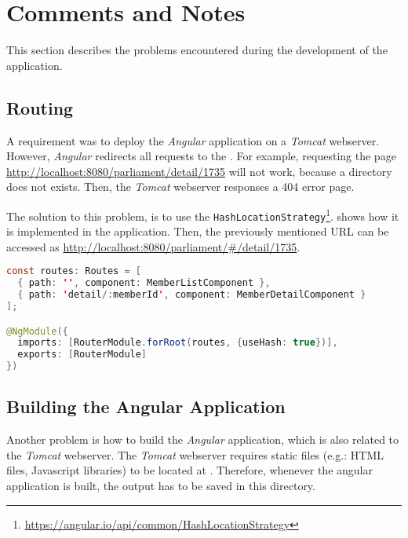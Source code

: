 \section{Comments and Notes}\label{sec:04_comments}
This section describes the problems encountered during the development of the application.


\subsection{Routing}\label{subsec:04_comments_routing}
A requirement was to deploy the \textit{Angular} application on a \textit{Tomcat} webserver. However, \textit{Angular} redirects all requests to the .
For example, requesting the page \url{http://localhost:8080/parliament/detail/1735} will not work, because a directory  does not exists. Then, the \textit{Tomcat} webserver responses a 404 error page.

The solution to this problem, is to use the \texttt{HashLocationStrategy}\footnote{\url{https://angular.io/api/common/HashLocationStrategy}}.  shows how it is implemented in the application.
Then, the previously mentioned URL can be accessed as \url{http://localhost:8080/parliament/#/detail/1735}.
\begin{lstlisting}[label=lst:04_comments_routing_hashrouting, caption=Application routing configuration of \texttt{app-routing.module.ts}, language=java]
const routes: Routes = [
  { path: '', component: MemberListComponent },
  { path: 'detail/:memberId', component: MemberDetailComponent }
];

@NgModule({
  imports: [RouterModule.forRoot(routes, {useHash: true})],
  exports: [RouterModule]
})
\end{lstlisting}


\subsection{Building the Angular Application}\label{subsec:04_comments_building}
Another problem is how to build the \textit{Angular} application, which is also related to the \textit{Tomcat} webserver.
The \textit{Tomcat} webserver requires static files (e.g.: HTML files, Javascript libraries) to be located at .
Therefore, whenever the angular application is built, the output has to be saved in this directory.

